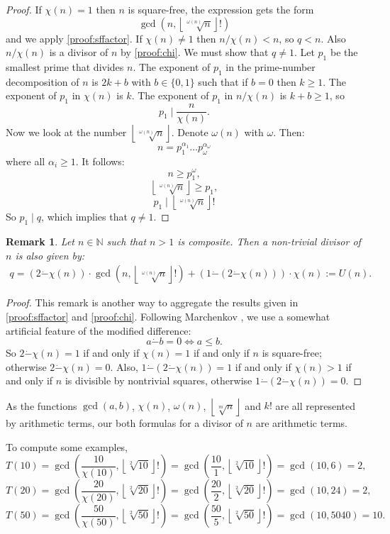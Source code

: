 \documentclass[10pt]{article}
\theoremstyle{plain}
\newtheorem{remark}{Remark}[section]
\newcommand{\floor}[1]{\left\lfloor #1 \right\rfloor}
\begin{document}
\begin{proof}
    If $\chi(n) = 1$ then $n$ is square-free, the expression gets the form
    $$\gcd\left( n, \floor{\sqrt[\omega(n)]{n}}! \right)  $$
    and we apply  \cref{proof:sffactor}.  If $\chi(n) \neq 1$ then $n/\chi(n) < n$, so $q < n$. Also $n/\chi(n)$ is a divisor of $n$ by \cref{proof:chi}. We must show that $q \neq 1$. Let $p_1$ be the smallest prime that divides $n$. The exponent of $p_1$ in the prime-number decomposition of $n$ is $2k+b$ with $b \in \{0,1\}$ such that if $b = 0$ then $k \geq 1$.
    The exponent of $p_1$ in $\chi(n)$ is $k$. The exponent of $p_1$ in $n/\chi(n)$ is $k+b \geq 1$, so
    $$p_1 \mid \frac{n}{\chi(n)}.$$
    Now we look at the number $\floor{\sqrt[\omega(n)]{n}}$. Denote $\omega(n)$ with $\omega$. Then:
    $$n = p_1^{\alpha_1}\dots p_\omega^{\alpha_\omega} $$
    where all $\alpha_i \geq 1$. It follows:
    $$n \geq p_1^\omega,$$
    $$\floor{\sqrt[\omega(n)]{n}} \geq p_1,$$
    $$p_1 \mid \floor{\sqrt[\omega(n)]{n}} !$$
    So $p_1 \mid q$, which implies that $q \neq 1$.
\end{proof}

\begin{remark} \label{proof:divisor} \rm
Let $n \in \mathbb{N}$ such that $n>1$ is composite. Then a non-trivial divisor of $n$ is also given by:
\begin{align*}
q = (2 \dot{-} \chi(n)) \cdot \gcd(n, \floor{\sqrt[\omega(n)]{n}}!) + (1 \dot{-} (2 \dot{-} \chi(n))) \cdot \chi(n) :=U(n).
\end{align*}
\end{remark}
\begin{proof}
This remark is another way to aggregate the results given in \cref{proof:sffactor} and \cref{proof:chi}. Following Marchenkov \cite{marchenkov2007superposition}, we use a somewhat artificial feature of the modified difference:
$$a \dot{-} b = 0 \iff a \leq b.$$
So $2 \dot{-} \chi(n) = 1$ if and only if $\chi(n) = 1$ if and only if $n$ is square-free; otherwise $2 \dot{-} \chi(n) = 0$. Also, $1 \dot{-} (2 \dot{-} \chi(n)) = 1$ if and only if $\chi(n) > 1$ if and only if $n$ is divisible by nontrivial squares, otherwise $1 \dot{-} (2 \dot{-} \chi(n)) = 0$.
\end{proof}

As the functions $\gcd(a, b)$, $\chi(n)$, $\omega(n)$, $\floor{\sqrt[m]{n}}$ and $k!$ are all represented by arithmetic terms, our both formulas for a divisor of $n$ are arithmetic terms.

To compute some examples,
$$T(10) = \gcd\left( \frac{10}{\chi(10)}, \floor{\sqrt[2]{10}}! \right)
= \gcd\left( \frac{10}{1}, \floor{\sqrt[2]{10}}! \right) = \gcd(10, 6) = 2,$$
$$T(20) = \gcd\left( \frac{20}{\chi(20)}, \floor{\sqrt[2]{20}}! \right)
= \gcd\left( \frac{20}{2}, \floor{\sqrt[2]{20}}! \right) = \gcd(10, 24) = 2,$$
$$T(50) = \gcd\left( \frac{50}{\chi(50)}, \floor{\sqrt[2]{50}}! \right)
= \gcd\left( \frac{50}{5}, \floor{\sqrt[2]{50}}! \right) = \gcd(10, 5040) = 10.$$
\end{document}
